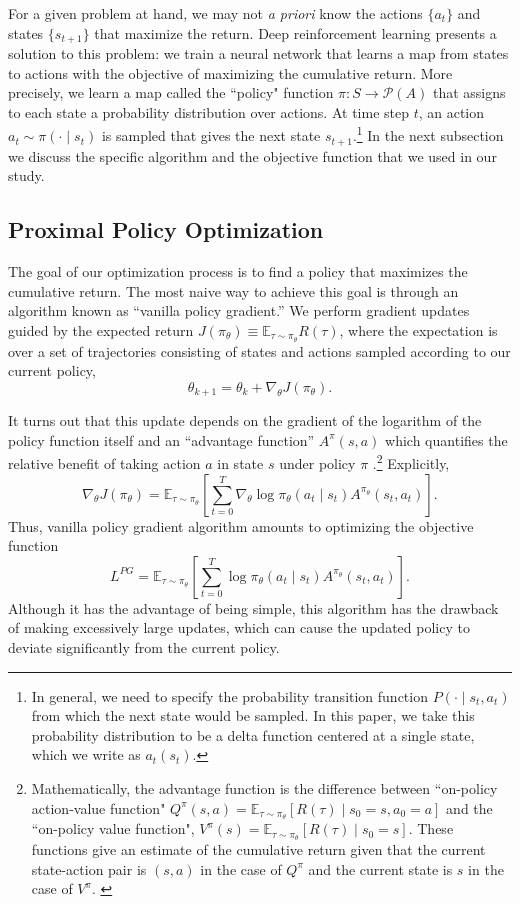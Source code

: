 For a given problem at hand, we may not \textit{a priori} know the actions $\{a_t\}$ and states $\{s_{t+1}\}$ that maximize the return. Deep reinforcement learning presents a solution to this problem: we train a neural network that learns a map from states to actions with the objective of maximizing the cumulative return. More precisely, we learn a map called the ``policy" function $\pi \colon S \to \mathcal{P}(A)$ that assigns to each state a probability distribution over actions. At time step $t$, an action $a_t \sim \pi(\cdot \mid s_t)$ is sampled that gives the next state $s_{t+1}$.\footnote{
In general, we need to specify the probability transition function $P(\cdot \mid s_t, a_t)$  from which the next state would be sampled. In this paper, we take this probability distribution to be a delta function centered at a single state, which we write as $a_t(s_t)$.}
In the next subsection we discuss the specific algorithm and the objective function that we used in our study.

\subsection{Proximal Policy Optimization} \label{sec:ppo}

The goal of our optimization process is to find a policy that maximizes the cumulative return. The most naive way to achieve this goal is through an algorithm known as ``vanilla policy gradient.''
We perform gradient updates guided by the expected return $J(\pi_\theta) \equiv \mathbb{E}_{\tau \sim \pi_\theta} R(\tau)$, where the expectation is over a set of trajectories consisting of states and actions sampled according to our current policy,
\[
\theta_{k+1} = \theta_k + \nabla_\theta J(\pi_\theta).
\]

It turns out that this update depends on the gradient of the logarithm of the policy function itself and an ``advantage function'' \( A^\pi (s, a) \) which quantifies the relative benefit of taking action \( a \) in state \( s \) under policy \( \pi \) \cite{SpinningUp2018}.\footnote{
Mathematically, the advantage function is the difference between ``on-policy action-value function" $Q^{\pi}(s, a) = \mathbb{E}_{\tau \sim \pi_\theta} [R(\tau) \mid s_0 = s, a_0 = a]$ and the ``on-policy value function", $V^{\pi}(s) = \mathbb{E}_{\tau \sim \pi_\theta} [R(\tau) \mid s_0 = s]$.
These functions give an estimate of the cumulative return given that the current state-action pair is $(s, a)$ in the case of $Q^\pi$ and the current state is $s$ in the case of $V^{\pi}$.
\label{ft:advantage}}
Explicitly,
\[
\nabla_\theta J(\pi_\theta) =
\mathbb{E}_{\tau \sim \pi_\theta} \left[ \sum\limits_{t=0}^T \nabla_\theta \log \pi_\theta (a_t \mid s_t) A^{\pi_\theta} (s_t, a_t) \right].
\]
Thus, vanilla policy gradient algorithm amounts to optimizing the objective function
\[
L^{PG} = \mathbb{E}_{\tau \sim \pi_\theta} \left[ \sum\limits_{t=0}^T \log \pi_\theta (a_t \mid s_t) A^{\pi_\theta} (s_t, a_t) \right].
\]
Although it has the advantage of being simple, this algorithm has the drawback of making excessively large updates, which can cause the updated policy to deviate significantly from the current policy.

